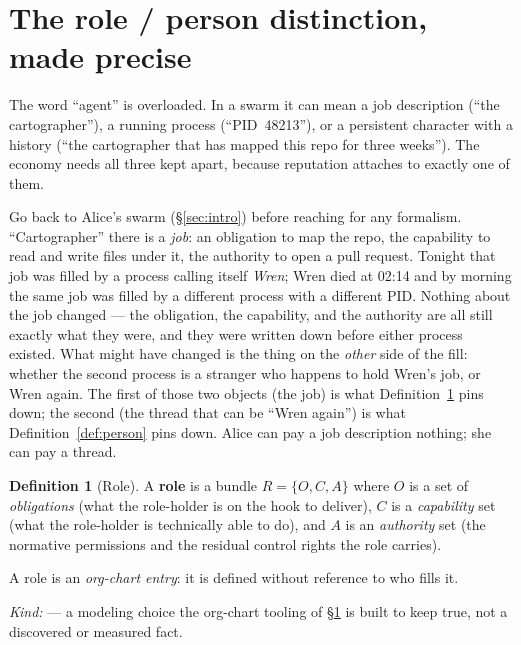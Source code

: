 \documentclass[11pt,a4paper]{article}
\theoremstyle{definition}
\newtheorem{definition}{Definition}[section]
\begin{document}
\section{The role / person distinction, made precise}\label{sec:role-person}

The word ``agent'' is overloaded. In a swarm it can mean a job description
(``the cartographer''), a running process (``PID~48213''), or a persistent
character with a history (``the cartographer that has mapped this repo for three
weeks''). The economy needs all three kept apart, because reputation attaches to
exactly one of them.

Go back to Alice's swarm (\S\ref{sec:intro}) before reaching for any formalism.
``Cartographer'' there is a \emph{job}: an obligation to map the repo, the
capability to read and write files under it, the authority to open a pull request.
Tonight that job was filled by a process calling itself \emph{Wren}; Wren died at
02:14 and by morning the same job was filled by a different process with a
different PID. Nothing about the job changed --- the obligation, the capability,
and the authority are all still exactly what they were, and they were written down
before either process existed. What might have changed is the thing on the
\emph{other} side of the fill: whether the second process is a stranger who
happens to hold Wren's job, or Wren again. The first of those two objects (the job)
is what Definition~\ref{def:role} pins down; the second (the thread that can be
``Wren again'') is what Definition~\ref{def:person} pins down. Alice can pay a
job description nothing; she can pay a thread.

\begin{definition}[Role]\label{def:role}
\setlength{\parskip}{4pt plus 1pt}
A \textbf{role} is a bundle $R = \{O, C, A\}$ where $O$ is a set of
\emph{obligations} (what the role-holder is on the hook to deliver), $C$ is a
\emph{capability} set (what the role-holder is technically able to do), and $A$
is an \emph{authority} set (the normative permissions and the residual control
rights the role carries). 

A role is an \emph{org-chart entry}: it is defined
without reference to who fills it. 

\emph{Kind:} \DesignInvariantKind{} --- a modeling
choice the org-chart tooling of \S\ref{sec:role-person} is built to keep true,
not a discovered or measured fact.
\end{definition}
\end{document}
